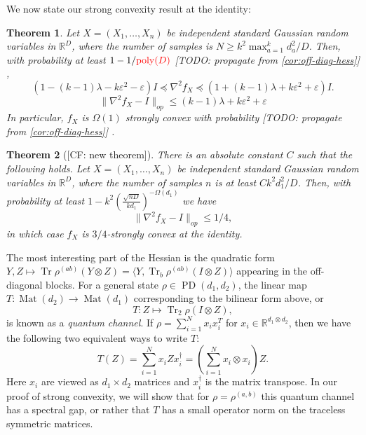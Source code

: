 \documentclass{article}
\newtheorem{theorem}{Theorem}
\DeclareMathOperator{\poly}{poly}
\DeclarePairedDelimiter{\norm}{\lVert}{\rVert}
\newcommand{\R}{{\mathbb{R}}}
\newcommand{\ot}{\otimes}
\newcommand{\mat}{\operatorname{Mat}}
\newcommand\eps{\varepsilon}
\newcommand\PD{\operatorname{PD}}
\newcommand\samp{x}
\newcommand\rv{X}
\newcommand\tr{\operatorname{Tr}}
\newcommand{\CF}[1]{{\color{purple}[CF: #1]}}
\newcommand{\MW}[1]{{\color{red}[MW: #1]}}
\newcommand{\TODO}[1]{{\color{blue}[TODO: #1]}}
\begin{document}







We now state our strong convexity result at the identity:

\begin{theorem}\label{thm:tensor-convexity-old}
Let $\rv = (\rv_1,\dots,\rv_n)$ be independent standard Gaussian random variables in $\R^D$, where the number of samples is $N \geq k^2 \max_{a=1}^k d_a^2 / D$. Then, with probability at least $1 - 1/{\color{red}\poly(D)}$ \TODO{propagate from \cref{cor:off-diag-hess}} , 
$$ (1 - (k - 1) \lambda - k \eps^2 - \eps) I \preceq 
 \nabla^2 f_{\rv} \preceq (1 + (k - 1) \lambda + k \eps^2 + \eps) I.$$
$$ \|\nabla^{2} f_{\rv} - I\|_{op} \leq (k - 1) \lambda + k \eps^2 + \eps $$
 In particular, $f_{\rv}$ is $\Omega(1)$ strongly convex with probability \TODO{propagate from \cref{cor:off-diag-hess}} . 
\end{theorem}

\begin{theorem}[\CF{new theorem}]\label{thm:tensor-convexity} There is an absolute constant $C$ such that the following holds. Let $\rv = (\rv_1,\dots,\rv_n)$ be independent standard Gaussian random variables in $\R^D$, where the number of samples $n$ is at least $C k^2 d_1^2/D$. Then, with probability at least $1 - k^2 \left(\frac {\sqrt{nD}}{kd_1}\right)^{ - \Omega(d_1)}$ we have
$$ \|\nabla^{2} f_{\rv} - I\|_{op} \leq 1/4,$$
in which case $f_{\rv}$ is $3/4$-strongly convex at the identity.
\end{theorem}



The most interesting part of the Hessian is the quadratic form $Y,Z \mapsto \tr \rho^{(ab)} \left( Y \ot Z \right) = \langle Y, \tr_b \rho^{(ab)} \left(I \ot Z\right) \rangle$ appearing in the off-diagonal blocks. For a general state $\rho \in \PD(d_1, d_2)$, the linear map $T:\mat(d_2) \to \mat(d_1)$ corresponding to the bilinear form above, or
$$T: Z \mapsto \tr_2 \rho \left(I \ot Z\right),$$
 is known as a \emph{quantum channel}. If $\rho = \sum_{i = 1}^N x_i x_i^T$ for $x_i \in \R^{d_1 \ot d_2}$, then we have the following two equivalent ways to write $T$:
$$ T(Z) = \sum_{i = 1}^N x_i Z x_i^\dagger = \left(\sum_{i = 1}^N x_i \ot x_i\right) Z.$$ 
Here $x_i$ are viewed as $d_1 \times d_2$ matrices and $x_i^\dagger$ is the matrix transpose. In our proof of strong convexity, we will show that for $\rho = \rho^{(a,b)}$ this quantum channel has a spectral gap, or rather that $T$ has a small operator norm on the traceless symmetric matrices. 
\end{document}
